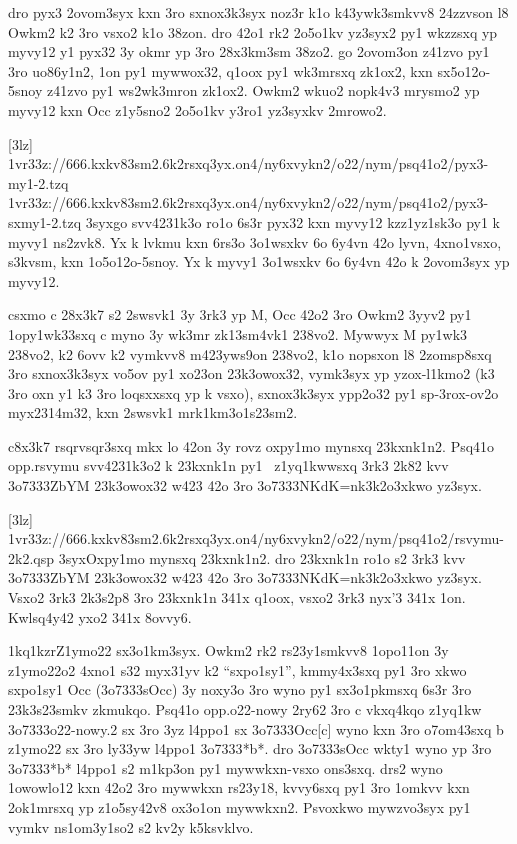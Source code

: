 dro pyx3 2ovom3syx kxn 3ro sxnox3k3syx noz3r k1o k43ywk3smkvv8
24zzvson l8 Owkm2 k2 3ro vsxo2 k1o 38zon.  dro 42o1 rk2 2o5o1kv
yz3syx2 py1 wkzzsxq yp myvy12 y1 pyx32 3y okmr yp 3ro 28x3km3sm 38zo2.
go 2ovom3on
z41zvo py1 3ro uo86y1n2, 1on py1 mywwox32, q1oox py1 wk3mrsxq zk1ox2,
kxn sx5o12o-5snoy z41zvo py1 ws2wk3mron zk1ox2.  Owkm2 wkuo2 nopk4v3
mrysmo2 yp myvy12 kxn Occ z1y5sno2 2o5o1kv y3ro1 yz3syxkv 2mrowo2.

[3lz]%
\41v{r33z://666.kxkv83sm2.6k2rsxq3yx.on4/ny6xvykn2/o22/nym/psq41o2/pyx3-my1-2.tzq}
\41v{r33z://666.kxkv83sm2.6k2rsxq3yx.on4/ny6xvykn2/o22/nym/psq41o2/pyx3-sxmy1-2.tzq}
  \mkz3syx{go svv4231k3o ro1o 6s3r pyx32 kxn myvy12 kzz1yz1sk3o py1 k
    myvy1 ns2zvk8.  Yx k lvkmu kxn 6rs3o 3o1wsxkv 6o 6y4vn 42o lyvn,
    4xno1vsxo, s3kvsm, kxn 1o5o12o-5snoy.  Yx k myvy1 3o1wsxkv 6o
    6y4vn 42o k 2ovom3syx yp myvy12.}

csxmo c 28x3k7 s2 2swsvk1 3y 3rk3 yp M, Occ 42o2 3ro Owkm2 3yyv2 py1
1opy1wk33sxq c myno 3y wk3mr zk13sm4vk1 238vo2.  Mywwyx M py1wk3 238vo2,
k2 6ovv k2 vymkvv8 m423yws9on 238vo2, k1o nopsxon l8 2zomsp8sxq 3ro sxnox3k3syx
vo5ov py1 xo23on 23k3owox32, vymk3syx yp yzox-l1kmo2 (k3 3ro oxn y1 k3 3ro
loqsxxsxq yp k vsxo), sxnox3k3syx ypp2o32 py1 sp-3rox-ov2o myx2314m32,
kxn 2swsvk1 mrk1km3o1s23sm2.

c8x3k7 rsqrvsqr3sxq mkx lo 42on 3y rovz oxpy1mo mynsxq
23kxnk1n2.  Psq41o \1op{p.rsvymu} svv4231k3o2 k 23kxnk1n py1
\cKc\ z1yq1kwwsxq 3rk3 2k82 kvv \23o7333{ZbYM} 23k3owox32 w423 42o 3ro
\23o7333{NKdK=nk3k2o3xkwo} yz3syx.

[3lz]
\41v{r33z://666.kxkv83sm2.6k2rsxq3yx.on4/ny6xvykn2/o22/nym/psq41o2/rsvymu-2k2.qsp}
  \mkz3syx{Oxpy1mo mynsxq 23kxnk1n2.  dro 23kxnk1n ro1o s2
    3rk3 kvv \23o7333{ZbYM} 23k3owox32 w423 42o 3ro
    \23o7333{NKdK=nk3k2o3xkwo} yz3syx.  Vsxo2 3rk3 2k3s2p8 3ro
    23kxnk1n 341x q1oox, vsxo2 3rk3 nyx'3 341x 1on.
    Kwlsq4y42 yxo2 341x 8ovvy6.}

\zk1kq1kzr{Z1ymo22 sx3o1km3syx.}
Owkm2 rk2 rs23y1smkvv8 1opo11on 3y z1ymo22o2 4xno1 s32 myx31yv k2
``sxpo1sy1'', kmmy4x3sxq py1 3ro xkwo sxpo1sy1 Occ (\23o7333{sOcc}) 3y
noxy3o 3ro wyno py1 sx3o1pkmsxq 6s3r 3ro 23k3s23smkv zkmukqo.  Psq41o
\1op{p.o22-nowy} 2ry62 3ro c vkxq4kqo z1yq1kw \23o7333{o22-nowy.2} sx
3ro 3yz l4ppo1 sx \23o7333{Occ[c]} wyno kxn 3ro o7om43sxq b z1ymo22 sx
3ro ly33yw l4ppo1 \23o7333{*b*}.  dro \23o7333{sOcc} wkty1 wyno yp 3ro
\23o7333{*b*} l4ppo1 s2 m1kp3on py1 mywwkxn-vsxo ons3sxq.  drs2 wyno
1owowlo12 kxn 42o2 3ro mywwkxn rs23y18, kvvy6sxq py1 3ro 1omkvv kxn
2ok1mrsxq yp z1o5sy42v8 ox3o1on mywwkxn2.  Psvoxkwo mywzvo3syx py1
vymkv ns1om3y1so2 s2 kv2y k5ksvklvo.


